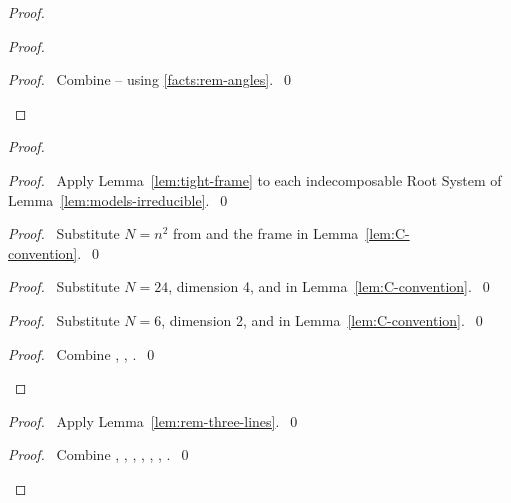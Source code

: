 \begin{proof}
\begin{proof}
\qedstep
\begin{proof}\pf\ Combine --
using \ref{facts:rem-angles}.~\qed\end{proof}
\end{proof}
\begin{proof}
\begin{proof}\pf\ Apply Lemma~\ref{lem:tight-frame} to each
indecomposable Root System of Lemma~\ref{lem:models-irreducible}.~\qed\end{proof}
\begin{proof}\pf\ Substitute $N=n^2$ from 
and the frame  in Lemma~\ref{lem:C-convention}.~\qed\end{proof}
\begin{proof}\pf\ Substitute $N=24$, dimension 4, and
 in Lemma~\ref{lem:C-convention}.~\qed\end{proof}
\begin{proof}\pf\ Substitute $N=6$, dimension 2, and
 in Lemma~\ref{lem:C-convention}.~\qed\end{proof}
\qedstep
\begin{proof}\pf\ Combine , , .~\qed\end{proof}
\end{proof}
\begin{proof}\pf\ Apply Lemma~\ref{lem:rem-three-lines}.~\qed\end{proof}
\qedstep
\begin{proof}\pf\ Combine , ,
, , ,
, .~\qed\end{proof}
\end{proof}


